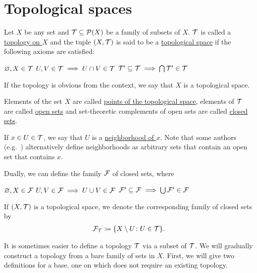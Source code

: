 \section{Topological spaces}\label{sec:topological_spaces}

\begin{definition}\label{def:topological_space}\cite[21]{Lectures:general_topology}
  Let $X$ be any set and $\mathcal T \subseteq \operatorname{\mathcal P}(X)$ be a family of subsets of $X$. $\mathcal T$ is called a \uline{topology on $X$} and the tuple $(X, \mathcal T)$ is said to be a \uline{topological space} if the following axioms are satisfied:
  \begin{description}
     $\varnothing, X \in \mathcal T$
     $U, V \in \mathcal T \implies U \cap V \in \mathcal T$
     $\mathcal T' \subseteq \mathcal T \implies \bigcap \mathcal T' \in \mathcal T$
  \end{description}

  If the topology is obvious from the context, we say that $X$ is a topological space.

  Elements of the set $X$ are called \uline{points of the topological space}, elements of $\mathcal T$ are called \uline{open sets} and set-theoretic complements of open sets are called \uline{closed sets}.

  If $x \in U \in \mathcal T$, we say that $U$ is a \uline{neighborhood of $x$}. Note that some authors (e.g.~\cite[38]{Kelley1955}) alternatively define neighborhoods as arbitrary sets that contain an open set that contains $x$.

  Dually, we can define the family $\mathcal F$ of closed sets, where
  \begin{description}
     $\varnothing, X \in \mathcal F$
     $U, V \in \mathcal F \implies U \cup V \in \mathcal F$
     $\mathcal F' \subseteq \mathcal F \implies \bigcup \mathcal F' \in \mathcal F$
  \end{description}

  If $(X, \mathcal T)$ is a topological space, we denote the corresponding family of closed sets by
  \begin{align*}
    \mathcal F_{\mathcal T} \coloneqq \{ X \setminus U \colon U \in \mathcal T \}.
  \end{align*}
\end{definition}

It is sometimes easier to define a topology $\mathcal T$ via a subset of $\mathcal T$. We will gradually construct a topology from a bare family of sets in $X$. First, we will give two definitions for a base, one on which does not require an existing topology.


